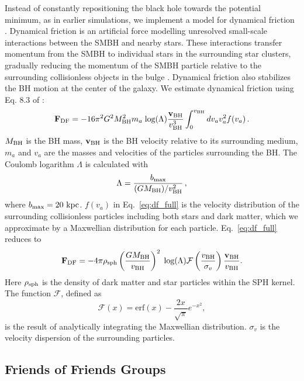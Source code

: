 \documentclass[fleqn,usenatbib]{mnras}
\begin{document}
Instead of constantly repositioning the black hole towards the potential minimum, as in earlier simulations, we implement a model for dynamical friction \citep{Tremmel2015, Tremmel2017, Chen2021}. Dynamical friction is an artificial force modelling unresolved small-scale interactions between the SMBH and nearby stars. These interactions transfer momentum from the SMBH to individual stars in the surrounding star clusters,  gradually reducing the momentum of the SMBH particle relative to the surrounding collisionless objects in the bulge \citep[e.g.][]{Governato1994,Kazantzidis2005}. Dynamical friction also stabilizes the BH motion at the center of the galaxy. We estimate dynamical friction using Eq. 8.3 of \cite{Binney2008}:
\begin{equation}
\label{eq:df_full}
    \mathbf{F}_{\rm DF} = -16\pi^2 G^2 M_{\rm BH}^2 m_{a} \;\text{log}(\Lambda) \frac{\mathbf{v}_{\rm BH}}{v_{\rm BH}^3} \int_0^{v_{\rm BH}} dv_a v_a^2 f(v_a)\,.
\end{equation}
$M_{\rm BH}$ is the BH mass, $\textbf{v}_{\rm BH}$ is the BH velocity relative to its surrounding medium, $m_a$ and $v_a$ are the masses and velocities of the particles surrounding the BH. The Coulomb logarithm $\Lambda$ is calculated with
\begin{equation}
    \Lambda = \frac{b_{\rm max}}{(GM_{\rm BH})/v_{\rm BH}^2}\,,
\end{equation}
where $b_{\rm max} = 20\text{ kpc}$.
$f(v_a)$ in Eq.~\ref{eq:df_full} is the velocity distribution of the surrounding collisionless particles including both stars and dark matter, which we approximate by a Maxwellian distribution for each particle.
Eq.~\ref{eq:df_full} reduces to
\begin{equation}
    \label{eq:H14}
    \mathbf{F}_{\rm DF} = -4\pi \rho_{\rm sph} \left(\frac{GM_{\rm BH}}{v_{\rm BH}}\right)^2  \;\text{log}(\Lambda) \mathcal{F}\left(\frac{v_{\rm BH}}{\sigma_v}\right) \frac{\bf{v}_{\rm BH}}{v_{\rm BH}}.
\end{equation}
Here $\rho_{\rm sph}$ is the density of dark matter and star particles within the SPH kernel.
The function $\mathcal{F}$, defined as
\begin{equation}
    \label{eq:fx}
    \mathcal{F}(x) =  \text{erf}(x)-\frac{2x}{\sqrt{\pi}} e^{-x^2},
\end{equation}
is the result of analytically integrating the Maxwellian distribution. $\sigma_v$ is the velocity dispersion of the surrounding particles.

\subsection{Friends of Friends Groups}
\label{sec:fof}
\end{document}
